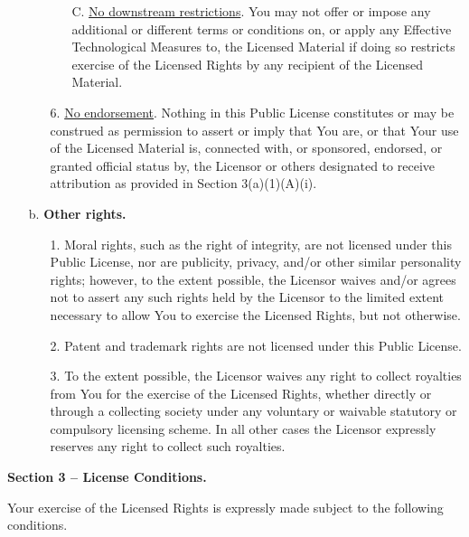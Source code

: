 \begin{itemize}
\begin{itemize}
\begin{itshape}
\begin{itemize}
            \item[C.] \underline{No downstream restrictions}. You may not offer or impose any additional or different terms or conditions on, or apply any Effective Technological Measures to, the Licensed Material if doing so restricts exercise of the Licensed Rights by any recipient of the Licensed Material.
        \end{itemize}\end{itshape}
        \item[6.] \underline{No endorsement}. Nothing in this Public License constitutes or may be construed as permission to assert or imply that You are, or that Your use of the Licensed Material is, connected with, or sponsored, endorsed, or granted official status by, the Licensor or others designated to receive attribution as provided in Section 3(a)(1)(A)(i).
    \end{itemize}
    \item[b.] \textbf{Other rights.}
    \begin{itemize}
        \item[1.] Moral rights, such as the right of integrity, are not licensed under this Public License, nor are publicity,
          privacy, and/or other similar personality rights; however, to the extent possible, the Licensor waives and/or agrees not to assert any such rights held by the Licensor to the limited extent necessary to allow You to exercise the Licensed Rights, but not otherwise.
        \item[2.] Patent and trademark rights are not licensed under this Public License.
        \item[3.] To the extent possible, the Licensor waives any right to collect royalties from You for the exercise of the Licensed Rights, whether directly or through a collecting society under any voluntary or waivable statutory or compulsory licensing scheme. In all other cases the Licensor expressly reserves any right to collect such royalties.
    \end{itemize}

\end{itemize}

\begin{center}
    \textbf{Section 3 -- License Conditions.}
\end{center}

Your exercise of the Licensed Rights is expressly made subject to the following conditions.

